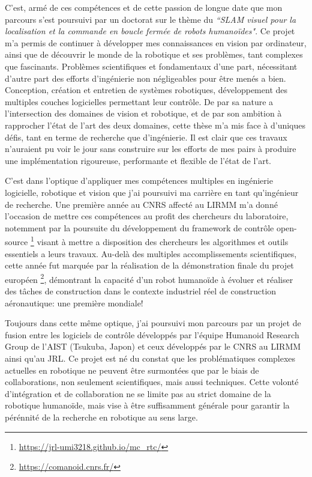 \documentclass[11pt, a4paper]{awesome-cv}
\begin{document}
\begin{cvletter}
  C'est, armé de ces compétences et de cette passion de longue date que mon parcours s'est poursuivi par un doctorat sur le thème du \emph{``SLAM visuel pour la localisation et la commande en boucle fermée de robots humanoïdes"}. Ce projet m'a permis de continuer à développer mes connaissances en vision par ordinateur, ainsi que de découvrir le monde de la robotique et ses problèmes, tant complexes que fascinants. Problèmes scientifiques et fondamentaux d'une part, nécessitant d'autre part des efforts d'ingénierie non négligeables pour être menés a bien. Conception, création et entretien de systèmes robotiques, développement des multiples couches logicielles permettant leur contrôle. De par sa nature a l'intersection des domaines de vision et robotique, et de par son ambition à rapprocher l'état de l'art des deux domaines, cette thèse m'a mis face à d'uniques défis, tant en terme de recherche que d'ingénierie. Il est clair que ces travaux n'auraient pu voir le jour sans construire sur les efforts de mes pairs à produire une implémentation rigoureuse, performante et flexible de l'état de l'art.

  C'est dans l'optique d'appliquer mes compétences multiples en ingénierie logicielle, robotique et vision que j'ai poursuivi ma carrière en tant qu'ingénieur de recherche. Une première année au CNRS affecté au LIRMM m'a donné l'occasion de mettre ces compétences au profit des chercheurs du laboratoire, notemment par la poursuite du développement du framework de contrôle open-source \footnote{\url{https://jrl-umi3218.github.io/mc_rtc/}} visant à mettre a disposition des chercheurs les algorithmes et outils essentiels a leurs travaux. Au-delà des multiples accomplissements scientifiques, cette année fut marquée par la réalisation de la démonstration finale du projet européen \footnote{\url{https://comanoid.cnrs.fr/}}, démontrant la capacité d'un robot humanoïde à évoluer et réaliser des tâches de construction dans le contexte industriel réel de construction aéronautique: une première mondiale!

  Toujours dans cette même optique, j'ai poursuivi mon parcours par un projet de fusion entre les logiciels de contrôle développés par l'équipe Humanoid Research Group de l'AIST (Tsukuba, Japon) et ceux développés par le CNRS au LIRMM ainsi qu'au JRL. Ce projet est né du constat que les problématiques complexes actuelles en robotique ne peuvent être surmontées que par le biais de collaborations, non seulement scientifiques, mais aussi techniques. Cette volonté d'intégration et de collaboration ne se limite pas au strict domaine de la robotique humanoïde, mais vise à être suffisamment générale pour garantir la pérénnité de la recherche en robotique au sens large.


\end{cvletter}
\end{document}
